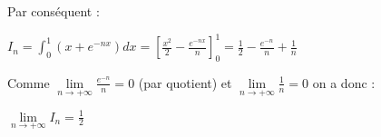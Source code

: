 \begin{corrige}
\begin{enumerate}
          \par
          Par conséquent :
          \par
          $I_{n}=\int_{0}^{1}\left(x+e^{-nx}\right) dx = \left[\frac{x^{2}}{2}-\frac{e^{-nx}}{n}\right]_{0}^{1} = \frac{1}{2}-\frac{e^{-n}}{n}+\frac{1}{n}$
          \par
          Comme $\lim\limits_{n\rightarrow +\infty }\frac{e^{-n}}{n}=0$ (par quotient) et  $\lim\limits_{n\rightarrow +\infty }\frac{1}{n}=0$ on a donc :
          \begin{center}$\lim\limits_{n\rightarrow +\infty }I_{n}=\frac{1}{2}$\end{center}
     \end{enumerate}
\end{corrige}
